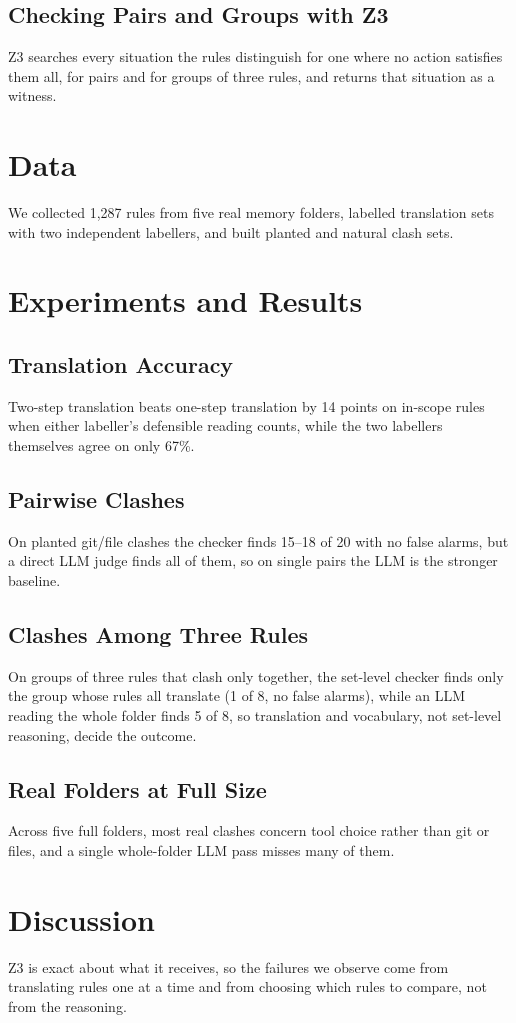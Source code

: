 \documentclass[11pt]{article}
\begin{document}
\subsection{Checking Pairs and Groups with Z3}
Z3 searches every situation the rules distinguish for one where no action satisfies them all,
for pairs and for groups of three rules, and returns that situation as a witness.

\section{Data}
We collected 1,287 rules from five real memory folders, labelled translation sets with two
independent labellers, and built planted and natural clash sets.

\section{Experiments and Results}
\subsection{Translation Accuracy}
Two-step translation beats one-step translation by 14 points on in-scope rules when either
labeller's defensible reading counts, while the two labellers themselves agree on only 67\%.
\subsection{Pairwise Clashes}
On planted git/file clashes the checker finds 15--18 of 20 with no false alarms, but a direct
LLM judge finds all of them, so on single pairs the LLM is the stronger baseline.
\subsection{Clashes Among Three Rules}
On groups of three rules that clash only together, the set-level checker finds only the group
whose rules all translate (1 of 8, no false alarms), while an LLM reading the whole folder finds
5 of 8, so translation and vocabulary, not set-level reasoning, decide the outcome.
\subsection{Real Folders at Full Size}
Across five full folders, most real clashes concern tool choice rather than git or files, and a
single whole-folder LLM pass misses many of them.

\section{Discussion}
Z3 is exact about what it receives, so the failures we observe come from translating rules one
at a time and from choosing which rules to compare, not from the reasoning.
\end{document}
